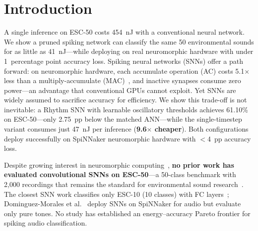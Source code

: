 \documentclass[sigconf,nonacm=false]{acmart}
\begin{document}

\maketitle

\section{Introduction}
\label{sec:intro}

A single inference on ESC-50 costs 454~nJ with a conventional neural network.
We show a pruned spiking network can classify the same 50 environmental sounds for as little as 41~nJ---while deploying on real neuromorphic hardware with under 1~percentage point accuracy loss.
Spiking neural networks (SNNs) offer a path forward: on neuromorphic hardware, each accumulate operation (AC) costs 5.1$\times$ less than a multiply-accumulate (MAC)~\cite{horowitz2014}, and inactive synapses consume zero power---an advantage that conventional GPUs cannot exploit.
Yet SNNs are widely assumed to sacrifice accuracy for efficiency.
We show this trade-off is not inevitable: a Rhythm SNN with learnable oscillatory thresholds achieves 61.10\% on ESC-50---only 2.75~pp below the matched ANN---while the single-timestep variant consumes just 47~nJ per inference (\textbf{9.6$\times$ cheaper}).
Both configurations deploy successfully on SpiNNaker neuromorphic hardware with $<$4~pp accuracy loss.

Despite growing interest in neuromorphic computing~\cite{schuman2022,maass1997}, \textbf{no prior work has evaluated convolutional SNNs on ESC-50}---a 50-class benchmark with 2{,}000 recordings that remains the standard for environmental sound research~\cite{piczak2015}.
The closest SNN work classifies only ESC-10 (10 classes) with FC layers~\cite{larroza2025}; Dominguez-Morales et al.~\cite{dominguez2016} deploy SNNs on SpiNNaker for audio but evaluate only pure tones.
No study has established an energy--accuracy Pareto frontier for spiking audio classification.
\end{document}
